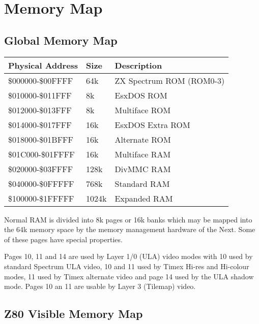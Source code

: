 \section{Memory Map}

\subsection{Global Memory Map}

\begin{tabular}{l|l|l}
  \textbf{Physical Address} & \textbf{Size} & \textbf{Description}\\
  \hline
  \$000000-\$00FFFF & 64k & ZX Spectrum ROM (ROM0-3)\\
  \$010000-\$011FFF & 8k & EsxDOS ROM\\
  \$012000-\$013FFF & 8k & Multiface ROM\\
  \$014000-\$017FFF & 16k & EsxDOS Extra ROM\\
  \$018000-\$01BFFF & 16k & Alternate ROM\\
  \$01C000-\$01FFFF & 16k & Multiface RAM\\
  \$020000-\$03FFFF & 128k & DivMMC RAM\\
  \$040000-\$0FFFFF & 768k & Standard RAM\\
  \$100000-\$1FFFFF & 1024k & Expanded RAM
\end{tabular}

Normal RAM is divided into 8k pages or 16k banks which may be mapped
into the 64k memory space by the memory management hardware of the
Next. Some of these pages have special properties.

Pages 10, 11 and 14 are used by Layer 1/0 (ULA) video modes with 10
used by standard Spectrum ULA video, 10 and 11 used by Timex Hi-res
and Hi-colour modes, 11 used by Timex alternate video and page 14 used
by the ULA shadow mode. Pages 10 an 11 are usable by Layer 3 (Tilemap)
video.

\subsection{Z80 Visible Memory Map}

